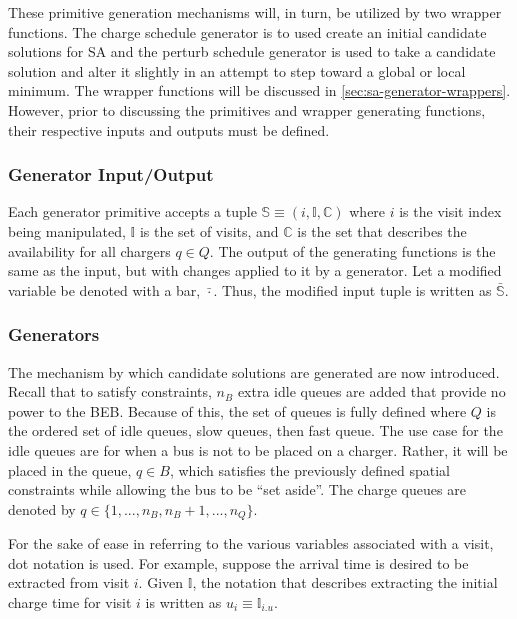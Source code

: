 \documentclass[ee,thesis]{usuthesis}
\newcommand{\I}{\mathbb{I}}                 %
\newcommand{\C}{\mathbb{C}}                 %
\newcommand{\Sol}{\mathbb{S}}               %
\newcommand{\Qset}{Q}                       %
\begin{document}
These primitive generation mechanisms will, in turn, be utilized by two wrapper functions. The charge schedule generator
is to used create an initial candidate solutions for SA and the perturb schedule generator is used to take a candidate
solution and alter it slightly in an attempt to step toward a global or local minimum. The wrapper functions will be
discussed in \ref{sec:sa-generator-wrappers}. However, prior to discussing the primitives and wrapper generating functions,
their respective inputs and outputs must be defined.

\subsubsection{Generator Input/Output}
\label{sec:sa-generator-input-output}
Each generator primitive accepts a tuple \(\Sol \equiv (i, \I, \C)\) where \(i\) is the visit index being manipulated, \(\I\) is
the set of visits, and \(\C\) is the set that describes the availability for all chargers \(q \in \Qset\). The output of the
generating functions is the same as the input, but with changes applied to it by a generator. Let a modified variable be
denoted with a bar, \(\bar{\cdot}\). Thus, the modified input tuple is written as \(\bar{\Sol}\).

\subsubsection{Generators}
\label{sec:sa-generators}
The mechanism by which candidate solutions are generated are now introduced. Recall that to satisfy constraints, \(n_B\)
extra idle queues are added that provide no power to the BEB. Because of this, the set of queues is fully defined where
\(Q\) is the ordered set of idle queues, slow queues, then fast queue. The use case for the idle queues are for when a bus
is not to be placed on a charger. Rather, it will be placed in the queue, \(q \in B\), which satisfies the previously
defined spatial constraints while allowing the bus to be ``set aside''. The charge queues are denoted by \(q \in \{1, ...,
n_B , n_B + 1, ..., n_Q\}\).

For the sake of ease in referring to the various variables associated with a visit, dot notation is used. For example,
suppose the arrival time is desired to be extracted from visit \(i\). Given \(\I\), the notation that describes extracting
the initial charge time for visit \(i\) is written as \(u_i \equiv \I_{i.u}\).
\end{document}
